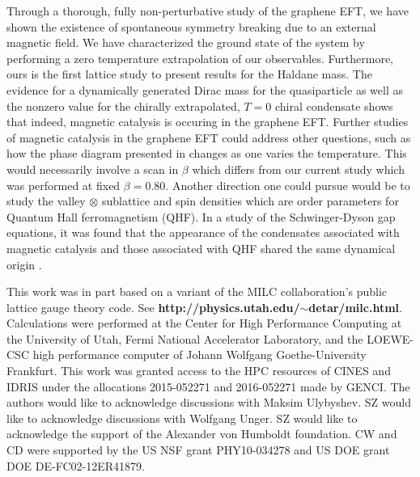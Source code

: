 \documentclass[aps,prd,twocolumn,showpacs,superscriptaddress,groupedaddress]{revtex4}  %
\begin{document}
Through a thorough, fully non-perturbative study of the graphene EFT, we have shown the existence of spontaneous symmetry breaking due to an external magnetic field.
We have characterized the ground state of the system by performing a zero temperature extrapolation of our observables. Furthermore, ours is the first lattice study to present results 
for the Haldane mass. The evidence for a dynamically generated Dirac mass for the quasiparticle as well as the nonzero value for the chirally extrapolated, $T=0$ chiral condensate shows
that indeed, magnetic catalysis is occuring in the graphene EFT. Further studies of magnetic catalysis in the graphene EFT could address other questions, such as how the phase diagram presented in \cite{Polikarpov} changes as one varies the temperature.
This would necessarily involve a scan in $\beta$ which differs from our current study which was performed at fixed $\beta=0.80$. Another direction one could pursue would be to 
study the valley $\otimes$ sublattice and spin densities which are order parameters for Quantum Hall ferromagnetism (QHF). In a study of the Schwinger-Dyson gap equations, it was found that 
the appearance of the condensates associated with magnetic catalysis and those associated with QHF shared the same dynamical origin \cite{MiranskyGraphene2}.


\acknowledgements
This work was in part based on a variant of the MILC collaboration's public lattice gauge theory code. See {\bf http://physics.utah.edu/$\sim$detar/milc.html}.
Calculations were performed at the Center for High Performance Computing at the University of Utah, Fermi National Accelerator Laboratory, and the LOEWE-CSC high performance
computer of Johann Wolfgang Goethe-University Frankfurt. This work was granted access to the HPC resources of CINES and IDRIS under the allocations 2015-052271 and 2016-052271 made by GENCI.
The authors would like to acknowledge discussions with Maksim Ulybyshev. SZ would like to acknowledge discussions with Wolfgang Unger.
SZ would like to acknowledge the support of the Alexander von Humboldt foundation. CW and CD were supported by the US NSF grant PHY10-034278 and US DOE grant DOE DE-FC02-12ER41879.

\appendix
\end{document}
